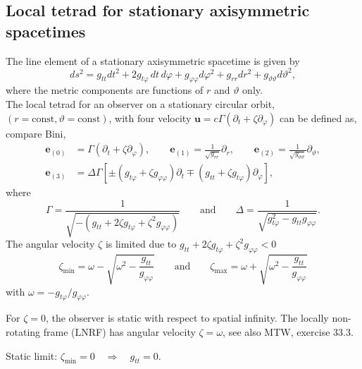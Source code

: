 \documentclass[10pt,twoside,notitlepage,a4paper,fleqn,openbib]{report}
\begin{document}
\subsection{Local tetrad for stationary axisymmetric spacetimes}\label{subsec:axisymST}
The line element of a stationary axisymmetric spacetime is given by
\begin{equation}
  ds^2 = g_{tt}dt^2 + 2g_{t\varphi}\,dt\,d\varphi+g_{\varphi\varphi}d\varphi^2+g_{rr}dr^2+g_{\vartheta\vartheta}d\vartheta^2,
\end{equation}
where the metric components are functions of $r$ and $\vartheta$ only.\\
The local tetrad for an observer on a stationary circular orbit, $(r=\text{const},\vartheta=\text{const})$, with four velocity $\mathbf{u}=c\Gamma\left(\partial_t+\zeta\partial_{\varphi}\right)$ can be defined as, compare Bini\cite{bini2000},
\begin{subequations}
\begin{align}
  \mathbf{e}_{(0)} &=\Gamma\left(\partial_t+\zeta\partial_{\varphi}\right),\qquad \mathbf{e}_{(1)} = \frac{1}{\sqrt{g_{rr}}}\partial_r,\qquad \mathbf{e}_{(2)} = \frac{1}{\sqrt{g_{\vartheta\vartheta}}}\partial_{\vartheta},\\
  \mathbf{e}_{(3)} &= \Delta\Gamma\left[\pm(g_{t\varphi}+\zeta g_{\varphi\varphi})\partial_t\mp(g_{tt}+\zeta g_{t\varphi})\partial_{\varphi}\right],
\end{align}
\end{subequations}
where
\begin{equation}
  \Gamma = \frac{1}{\sqrt{-\left(g_{tt}+2\zeta g_{t\varphi}+\zeta^2g_{\varphi\varphi}\right)}}\qquad\text{and}\qquad\Delta=\frac{1}{\sqrt{g_{t\varphi}^2-g_{tt}g_{\varphi\varphi}}}.
\end{equation}%
The angular velocity $\zeta$ is limited due to $g_{tt}+2\zeta g_{t\varphi}+\zeta^2g_{\varphi\varphi}<0$
\begin{equation}
  \zeta_{\text{min}} = \omega-\sqrt{\omega^2-\frac{g_{tt}}{g_{\varphi\varphi}}}\qquad\text{and}\qquad \zeta_{\text{max}} = \omega+\sqrt{\omega^2-\frac{g_{tt}}{g_{\varphi\varphi}}}
\end{equation}
with $\omega = -g_{t\varphi}/g_{\varphi\varphi}$.%

For $\zeta=0$, the observer is static with respect to spatial infinity. The locally non-rotating frame (LNRF) has angular velocity $\zeta=\omega$, see also MTW\cite{mtw}, exercise 33.3.

Static limit: $\zeta_{\text{min}}=0\quad\Rightarrow\quad g_{tt}=0$.
\end{document}
